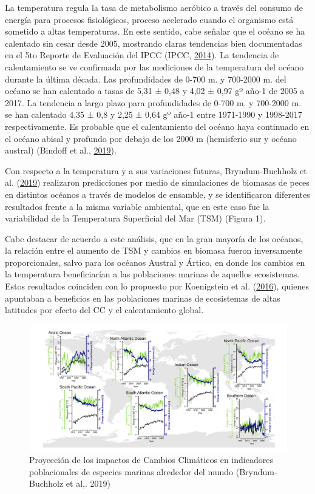 \documentclass[
]{article}
\begin{document}
La temperatura regula la tasa de metabolismo aeróbico a través del
consumo de energía para procesos fisiológicos, proceso acelerado cuando
el organismo está sometido a altas temperaturas. En este sentido, cabe
señalar que el océano se ha calentado sin cesar desde 2005, mostrando
claras tendencias bien documentadas en el 5to Reporte de Evaluación del
IPCC (IPCC, \protect\hyperlink{ref-IPCC2014}{2014}). La tendencia de
calentamiento se ve confirmada por las mediciones de la temperatura del
océano durante la última década. Las profundidades de 0-700 m. y
700-2000 m. del océano se han calentado a tasas de 5,31 ± 0,48 y 4,02 ±
0,97 gº año-1 de 2005 a 2017. La tendencia a largo plazo para
profundidades de 0-700 m. y 700-2000 m. se han calentado 4,35 ± 0,8 y
2,25 ± 0,64 gº año-1 entre 1971-1990 y 1998-2017 respectivamente. Es
probable que el calentamiento del océano haya continuado en el océano
abisal y profundo por debajo de los 2000 m (hemisferio sur y océano
austral) (Bindoff et al., \protect\hyperlink{ref-Bindoff2019}{2019}).

Con respecto a la temperatura y a sus variaciones futuras,
Bryndum-Buchholz et al.
(\protect\hyperlink{ref-Bryndum-Buchholz2019}{2019}) realizaron
predicciones por medio de simulaciones de biomasas de peces en distintos
océanos a través de modelos de ensamble, y se identificaron diferentes
resultados frente a la misma variable ambiental, que en este caso fue la
variabilidad de la Temperatura Superficial del Mar (TSM) (Figura 1).

Cabe destacar de acuerdo a este análisis, que en la gran mayoría de los
océanos, la relación entre el aumento de TSM y cambios en biomasa fueron
inversamente proporcionales, salvo para los océanos Austral y Ártico, en
donde los cambios en la temperatura beneficiarían a las poblaciones
marinas de aquellos ecosistemas. Estos resultados coinciden con lo
propuesto por Koenigstein et al.
(\protect\hyperlink{ref-Koenigstein2016}{2016}), quienes apuntaban a
beneficios en las poblaciones marinas de ecosistemas de altas latitudes
por efecto del CC y el calentamiento global.

\pagebreak

\begin{figure}

{\centering \includegraphics[width=1\linewidth]{images/Exa} 

}

\caption{Proyección de los impactos de Cambios Climáticos en indicadores poblacionales de especies marinas alrededor del mundo (Bryndum-Buchholz et al,. 2019)}\label{fig:unnamed-chunk-1}
\end{figure}
\end{document}
